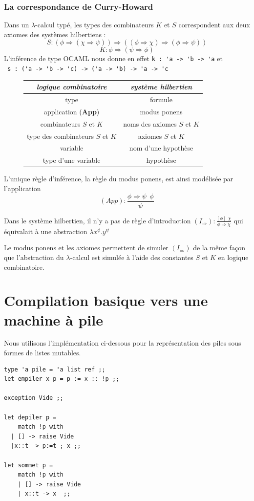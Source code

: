 \documentclass[11pt]{book}
\begin{document}
\subsubsection{La correspondance de Curry-Howard}
Dans un $\lambda$-calcul typé, les types des combinateurs $K$ et $S$ correspondent aux deux axiomes
des systèmes hilbertiens :
$$ S : (\phi \Rightarrow (\chi \Rightarrow \psi)) \Rightarrow ((\phi \Rightarrow \chi) \Rightarrow(\phi \Rightarrow \psi)) 
$$
$$   K : \phi \Rightarrow (\psi \Rightarrow \phi)
$$
L'inférence de type OCAML nous donne en effet 
\verb+k : 'a -> 'b -> 'a+ et  \\ 
\verb+ s : ('a -> 'b -> 'c) -> ('a -> 'b) -> 'a -> 'c+
\begin{center}
\begin{figure}[H]
	\begin{tabular}{|c|c|} \hline
		\textit{logique combinatoire} & \textit{système hilbertien} \\ \hline
		type & formule \\
		application (\textbf{App}) & modus ponens \\
		combinateurs $S$ et $K$ & noms des axiomes $S$ et $K$ \\
		type des combinateurs $S$ et $K$ & axiomes $S$ et $K$ \\
		variable & nom d'une hypothèse \\
		type d'une variable & hypothèse \\ \hline
	\end{tabular}	
\end{figure}
\end{center}

L'unique règle d'inférence, la règle du modus ponens, est ainsi modélisée par l'application
$$ (App) : \frac{\phi \Rightarrow \psi \ \ \phi}{\psi} $$

Dans le système hilbertien, il n'y a pas de règle d'introduction 
$(I_\Rightarrow) : \frac{[\phi]\ \ \chi}{\phi \Rightarrow \chi}$ qui équivalait à une abstraction 
$\lambda x^\phi.y^\psi $

Le modus ponens et les axiomes permettent de simuler $(I_\Rightarrow )$ de la même façon que 
l'abstraction du $\lambda$-calcul est simulée à l'aide des constantes $S$ et $K$ en logique combinatoire.


\section{Compilation basique vers une machine à pile}
Nous utilisons l'implémentation ci-dessous pour la représentation des piles sous
formes de listes mutables.
\begin{Verbatim}
type 'a pile = 'a list ref ;;
let empiler x p = p := x :: !p ;;

exception Vide ;;

let depiler p =  
	match !p with
  | [] -> raise Vide
  |x::t -> p:=t ; x ;;

let sommet p =
	match !p with
	| [] -> raise Vide
	| x::t -> x  ;;
\end{Verbatim}
\end{document}
